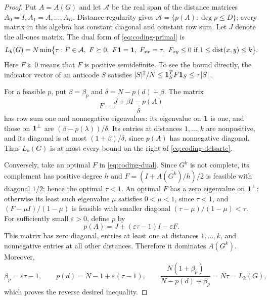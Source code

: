 \documentclass[11pt]{article}
\theoremstyle{plain}
\numberwithin{equation}{section}
\DeclareMathOperator{\dist}{dist}
\def\1{\mbox{\boldmath $1$}}
\begin{document}
\begin{proof}
Put $A=A(G)$ and let $\mathcal A$ be the real span of the distance
matrices $A_0=I,A_1=A,\ldots,A_D$. Distance-regularity gives
$\mathcal A=\{p(A):\deg p\le D\}$; every matrix in this algebra has constant diagonal and constant row sum. Let $J$ denote the all-ones matrix. The dual form of \eqref{eq:coding-primal} is
\begin{equation}\label{eq:coding-dual}
 L_k(G)=N\min\bigl\{\tau:
 F\in\mathcal A,\ F\succeq0,\ F\1=\1,\ F_{xx}=\tau,
 \ F_{xy}\le0\ \text{if }1\le\dist(x,y)\le k\bigr\}.
\end{equation}
Here $F\succeq0$ means that $F$ is positive semidefinite. To see the
bound directly, the indicator vector of an anticode $S$ satisfies
$|S|^2/N\le\1_S^T F\1_S\le\tau|S|$.

For a feasible $p$, put $\beta=\beta_p$ and
$\delta=N-p(d)+\beta$. The matrix
\[
 F=\frac{J+\beta I-p(A)}{\delta}
\]
has row sum one and nonnegative eigenvalues: its eigenvalue on $\1$ is one, and those on $\1^\perp$ are $(\beta-p(\lambda))/\delta$. Its entries at distances $1,\ldots,k$ are nonpositive, and its diagonal is at most $(1+\beta)/\delta$, since $p(A)$ has nonnegative diagonal. Thus $L_k(G)$ is at most every bound on the right of
\eqref{eq:coding-delsarte}.

Conversely, take an optimal $F$ in \eqref{eq:coding-dual}.
Since $G^k$ is not complete, its complement has positive degree $h$ and $F=(I+A(\overline{G^k})/h)/2$ is feasible with diagonal $1/2$; hence the optimal $\tau<1$.
An optimal $F$ has a zero eigenvalue on $\1^\perp$: otherwise its least
such eigenvalue $\mu$ satisfies $0<\mu<1$, since $\tau<1$, and
$(F-\mu I)/(1-\mu)$ is feasible with smaller diagonal
$(\tau-\mu)/(1-\mu)<\tau$.
For sufficiently small $\varepsilon>0$, define $p$ by
\[
 p(A)=J+(\varepsilon\tau-1)I-\varepsilon F.
\]
This matrix has zero diagonal, entries at least one at distances
$1,\ldots,k$, and nonnegative entries at all other distances. Therefore it dominates $A(G^k)$. Moreover,
\[
 \beta_p=\varepsilon\tau-1,\qquad
 p(d)=N-1+\varepsilon(\tau-1),\qquad
 \frac{N(1+\beta_p)}{N-p(d)+\beta_p}=N\tau=L_k(G),
\]
which proves the reverse desired inequality.
\end{proof}

\end{document}
